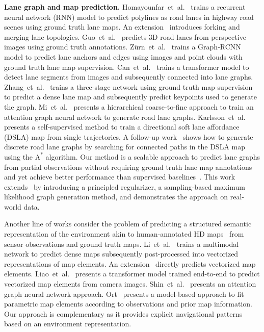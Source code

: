 \documentclass[letterpaper, 10 pt, conference]{ieeeconf}
\begin{document}
\noindent \textbf{Lane graph and map prediction.}
Homayounfar~et~al.~\cite{homayounfar2018hran} trains a recurrent neural network (RNN) model to predict polylines as road lanes in highway road scenes using ground truth lane maps. An extension~\cite{homayounfar2019dagmapper} introduces forking and merging lane topologies.
Guo~et~al.~\cite{guo2020genlanenet} predicts 3D road lanes from perspective images using ground truth annotations.
Z\"urn~et~al.~\cite{zurn2021lanegraphnet} trains a Graph-RCNN model to predict lane anchors and edges using images and point clouds with ground truth lane map supervision.
Can~et~al.~\cite{can2021stsu} trains a transformer model to detect lane segments from images and subsequently connected into lane graphs.
Zhang~et~al.~\cite{zhang2021hierarchical_road_topology_learning} trains a three-stage network using ground truth map supervision to predict a dense lane map and subsequently predict keypoints used to generate the graph.
Mi~et~al.~\cite{mi2021hdmapgen} presents a hierarchical coarse-to-fine approach to train an attention graph neural network to generate road lane graphs.
Karlsson~et~al.~\cite{karlsson2020dsla} presents a self-supervised method to train a directional soft lane affordance (DSLA) map from single trajectories. A follow-up work~\cite{karlsson2021gdsla} shows how to generate discrete road lane graphs by searching for connected paths in the DSLA map using the $\text{A}^*$ algorithm. 
Our method is a scalable approach to predict lane graphs from partial observations without requiring ground truth lane map annotations and yet achieve better performance than supervised baselines~\cite{zurn2021lanegraphnet, can2021stsu}. This work extends~\cite{karlsson2020dsla,karlsson2021gdsla} by introducing a principled regularizer, a sampling-based maximum likelihood graph generation method, and demonstrates the approach on real-world data.

Another line of works consider the problem of predicting a structured semantic representation of the environment akin to human-annotated HD maps~\cite{sheif2016hdmaps} from sensor observations and ground truth maps. 
Li~et~al.~\cite{li2022hdmapnet} trains a multimodal network to predict dense maps subsequently post-processed into vectorized representations of map elements.
An extension~\cite{liu2023vectormapnet} directly predicts vectorized map elements.
Liao~et~al.~\cite{liaomaptr} presents a transformer model trained end-to-end to predict vectorized map elements from camera images.
Shin~et~al.~\cite{shin2023instagram} presents an attention graph neural network approach.
Ort~\cite{ort2022maplite2} presents a model-based approach to fit parametric map elements according to observations and prior map information.
Our approach is complementary as it provides explicit navigational patterns based on an environment representation.
\end{document}
